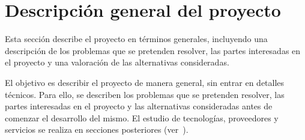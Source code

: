 \chapter{Descripción general del proyecto}\label{chap:desc}
Esta sección describe el proyecto en términos generales, incluyendo una
descripción de los problemas que se pretenden resolver, las partes interesadas
en el proyecto y una valoración de las alternativas consideradas.

El objetivo es describir el proyecto de manera general, sin entrar en detalles
técnicos. Para ello, se describen los problemas que se pretenden resolver, las
partes interesadas en el proyecto y las alternativas consideradas antes de
comenzar el desarrollo del mismo. El estudio de tecnologías, proveedores y
servicios se realiza en secciones posteriores (ver~).

\newpage{}


\newpage{}


\newpage{}

